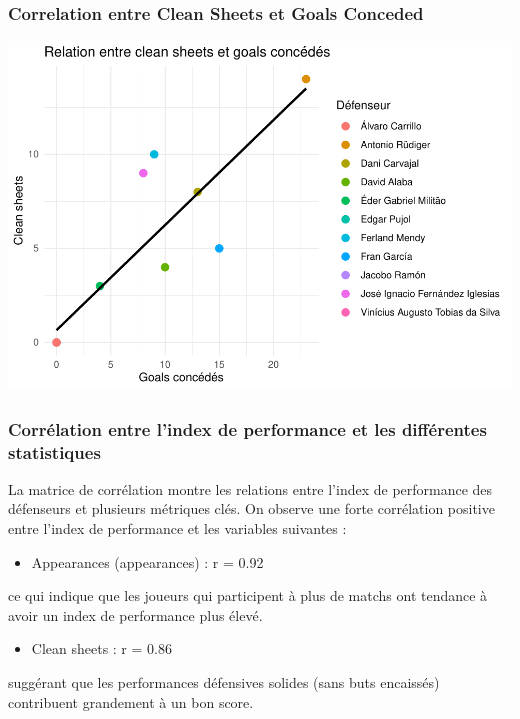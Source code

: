 \documentclass[
  6pt,
]{article}
\providecommand{\tightlist}{%
  \setlength{\itemsep}{0pt}\setlength{\parskip}{0pt}}
\begin{document}
\subsubsection{Correlation entre Clean Sheets et Goals
Conceded}\label{correlation-entre-clean-sheets-et-goals-conceded}

\includegraphics[width=0.8\linewidth]{Analyse_Impact_Performances_Joueurs_files/figure-latex/CorrelationCleansheets et goalsconceded-def-1}

\subsubsection{Corrélation entre l'index de performance et les
différentes
statistiques}\label{corruxe9lation-entre-lindex-de-performance-et-les-diffuxe9rentes-statistiques}

La matrice de corrélation montre les relations entre l'index de
performance des défenseurs et plusieurs métriques clés. On observe une
forte corrélation positive entre l'index de performance et les variables
suivantes :

\begin{itemize}
\tightlist
\item
  Appearances (appearances) : r = 0.92
\end{itemize}

ce qui indique que les joueurs qui participent à plus de matchs ont
tendance à avoir un index de performance plus élevé.

\begin{itemize}
\tightlist
\item
  Clean sheets : r = 0.86
\end{itemize}

suggérant que les performances défensives solides (sans buts encaissés)
contribuent grandement à un bon score.
\end{document}
